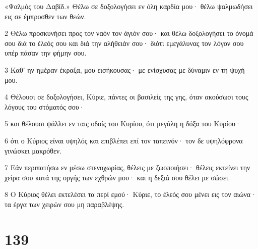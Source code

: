 \par «Ψαλμός του Δαβίδ.» Θέλω σε δοξολογήσει εν όλη καρδία μου· θέλω ψαλμωδήσει εις σε έμπροσθεν των θεών.
\par 2 Θέλω προσκυνήσει προς τον ναόν τον άγιόν σου· και θέλω δοξολογήσει το όνομά σου διά το έλεός σου και διά την αλήθειάν σου· διότι εμεγάλυνας τον λόγον σου υπέρ πάσαν την φήμην σου.
\par 3 Καθ' ην ημέραν έκραξα, μου εισήκουσας· με ενίσχυσας με δύναμιν εν τη ψυχή μου.
\par 4 Θέλουσι σε δοξολογήσει, Κύριε, πάντες οι βασιλείς της γης, όταν ακούσωσι τους λόγους του στόματός σου·
\par 5 και θέλουσι ψάλλει εν ταις οδοίς του Κυρίου, ότι μεγάλη η δόξα του Κυρίου·
\par 6 ότι ο Κύριος είναι υψηλός και επιβλέπει επί τον ταπεινόν· τον δε υψηλόφρονα γινώσκει μακρόθεν.
\par 7 Εάν περιπατήσω εν μέσω στενοχωρίας, θέλεις με ζωοποιήσει· θέλεις εκτείνει την χείρα σου κατά της οργής των εχθρών μου· και η δεξιά σου θέλει με σώσει.
\par 8 Ο Κύριος θέλει εκτελέσει τα περί εμού· Κύριε, το έλεός σου μένει εις τον αιώνα· τα έργα των χειρών σου μη παραβλέψης.

\chapter{139}

